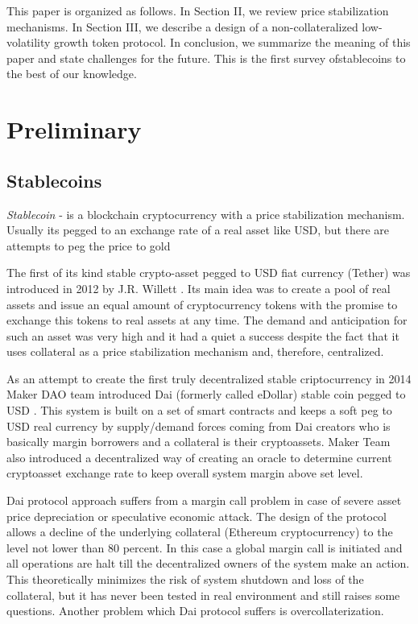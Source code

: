 \documentclass[12pt, a4paper, twocolumn]{article}
\begin{document}
This paper is organized as follows. In Section II, we review price stabilization mechanisms. In Section III, we describe a design of a non-collateralized low-volatility growth token protocol. In conclusion, we summarize the meaning of this paper and state challenges for the future. This is the first survey ofstablecoins to the best of our knowledge. 

\section{Preliminary}

\subsection{Stablecoins}

\textit{Stablecoin}  - is a blockchain cryptocurrency with a price stabilization mechanism. Usually its pegged to an exchange rate of a real asset like USD, but there are attempts to peg the price to gold \cite{digix}

The first of its kind stable crypto-asset pegged to USD fiat currency (Tether) was introduced in 2012 by J.R. Willett \cite{tether}. Its main idea was to create a pool of real assets and issue an equal amount of cryptocurrency tokens with the promise to exchange this tokens to real assets at any time. The demand and anticipation for such an asset was very high and it had a quiet a success despite the fact that it uses collateral as a price stabilization mechanism and, therefore, centralized. 

As an attempt to create the first truly decentralized stable criptocurrency in 2014 Maker DAO team introduced Dai (formerly called eDollar) stable coin pegged to USD \cite{dai}. This system is built on a set of smart contracts and keeps a soft peg to USD real currency by supply/demand forces coming from Dai creators who is basically margin borrowers and a collateral is their cryptoassets. Maker Team also introduced a decentralized way of creating an oracle to determine current cryptoasset exchange rate to keep overall system margin above set level. 

Dai protocol approach suffers from a margin call problem in case of severe asset price depreciation or speculative economic attack. The design of the protocol allows a decline of the underlying collateral (Ethereum cryptocurrency) to the level not lower than 80 percent. In this case a global margin call is initiated and all operations are halt till the decentralized owners of the system make an action. This theoretically minimizes the risk of system shutdown and loss of the collateral, but it has never been tested in real environment and still raises some questions. Another problem which Dai protocol suffers is overcollaterization. 
\end{document}
